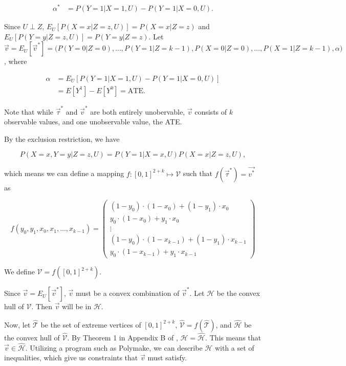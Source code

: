 \documentclass[
]{article}
\theoremstyle{plain}
\begin{document}
\[
\begin{aligned}
\alpha^* &= P(Y = 1 | X = 1, U) - P(Y = 1 | X = 0, U).
\end{aligned}
\]

Since \(U \perp Z\), \(E_U[P(X = x | Z = z, U)] = P(X = x | Z = z)\) and \(E_U[P(Y = y | Z = z, U)] = P(Y = y | Z = z)\). Let \(\vec{v} = E_U[\vec{v}^*] = \Big(P(Y = 0 | Z = 0), ..., P(Y = 1 | Z = k-1), P(X = 0 | Z = 0), ..., P(X = 1 | Z = k-1), \alpha \Big)\), where

\[
\begin{aligned}
\alpha &= E_U[P(Y = 1 | X = 1, U) - P(Y = 1 | X = 0, U)] \\
       &= E[Y^1] - E[Y^0] = \text{ATE}.
\end{aligned}
\]

Note that while \(\vec{\tau}^*\) and \(\vec{v}^*\) are both entirely unobervable, \(\vec{v}\) consists of \(k\) observable values, and one unobservable value, the ATE.

By the exclusion restriction, we have

\[
P(X = x, Y = y | Z = z, U) = P(Y = 1 | X = x, U) P(X = x | Z = z, U),
\]

which means we can define a mapping \(f:[0,1]^{2+k} \mapsto \mathcal{V}\) such that \(f(\vec{\tau}^*) = \vec{v^*}\) as

\[
f(y_0, y_1, x_0, x_1, ..., x_{k-1}) =
  \begin{pmatrix}
    (1-y_0)\cdot(1-x_0) + (1 - y_1)\cdot x_0 \\
    y_0\cdot (1-x_0) + y_1\cdot x_0 \\
    \vdots \\
    (1-y_0)\cdot(1-x_{k-1}) + (1 - y_1)\cdot x_{k-1} \\
    y_0\cdot (1-x_{k-1}) + y_1\cdot x_{k-1}
  \end{pmatrix} \label{eq:f}
\]

We define \(\mathcal{V} = f([0,1]^{2+k})\).

Since \(\vec{v} = E_U[\vec{v}^*]\), \(\vec{v}\) must be a convex combination of \(\vec{v}^*\). Let \(\mathcal{H}\) be the convex hull of \(\mathcal{V}\). Then \(\vec{v}\) will be in \(\mathcal{H}\).

Now, let \(\hat{\mathcal{T}}\) be the set of extreme vertices of \([0,1]^{2+k}\), \(\hat{\mathcal{V}} = f(\hat{\mathcal{T}})\), and \(\hat{\mathcal{H}}\) be the convex hull of \(\hat{\mathcal{V}}\). By Theorem 1 in Appendix B of \textcite{ramsahai_causal_2012}, \(\mathcal{H} = \mathcal{\hat{H}}\). This means that \(\vec{v} \in \mathcal{\hat{H}}\). Utilizing a program such as Polymake, we can describe \(\mathcal{H}\) with a set of inequalities, which give us constraints that \(\vec{v}\) must satisfy.
\end{document}
